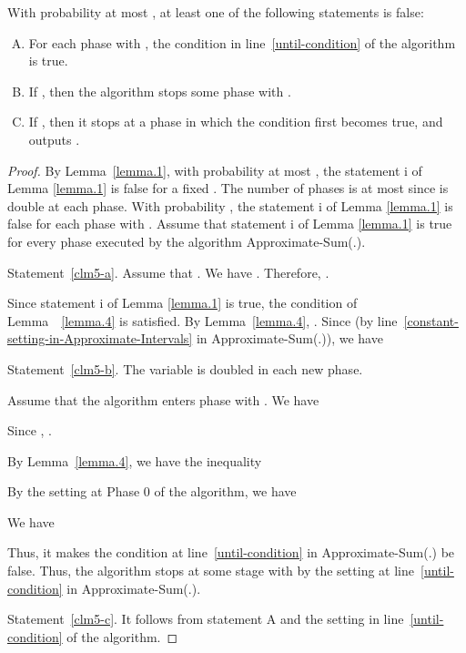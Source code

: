\documentclass[runningheads]{llncs}
\begin{document}
\begin{lemma}\label{lemma.5}
With probability at most ,  at least one of the following statements is false:
\begin{enumerate}[A.]
\item\label{clm5-a}
For each phase  with ,  the condition  in
line~\ref{until-condition} of the algorithm is true.
\item\label{clm5-b}
If , then the algorithm stops some phase 
with .

\item\label{clm5-c}
If , then it stops  at a phase  in which the
condition  first becomes true, and outputs
.
\end{enumerate}
\end{lemma}

\begin{proof}
By Lemma~\ref{lemma.1}, with probability at most , the statement i of Lemma \ref{lemma.1} is
false for a fixed . The number of phases is at most 
since  is double at each phase. With probability , the statement i of Lemma
\ref{lemma.1} is false for each phase  with . Assume
that statement i of Lemma \ref{lemma.1} is true for every phase 
executed by the algorithm Approximate-Sum(.).

Statement~\ref{clm5-a}.  Assume that . We have .
Therefore, .


Since statement i of Lemma \ref{lemma.1} is true,  the condition of
Lemma~~\ref{lemma.4} is satisfied.  By Lemma~\ref{lemma.4},
.
 Since  (by line~\ref{constant-setting-in-Approximate-Intervals} in Approximate-Sum(.)), we have

Statement~\ref{clm5-b}. The variable  is doubled in each new
phase.

Assume that the algorithm enters phase  with .  We have

 Since
, .


By Lemma~\ref{lemma.4}, we have the inequality

By the setting at Phase 0 of the algorithm, we have

We have

Thus, it makes the condition at line~\ref{until-condition} in
Approximate-Sum(.) be false. Thus, the algorithm stops at some stage
 with  by the
setting at line~\ref{until-condition} in Approximate-Sum(.).

 Statement~\ref{clm5-c}. It follows from statement A and the
setting in line~\ref{until-condition} of the algorithm.
\end{proof}
\end{document}
